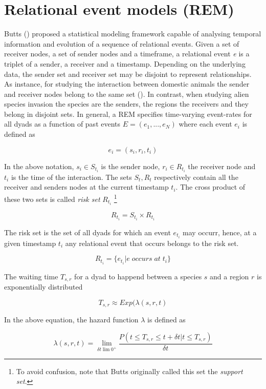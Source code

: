 \documentclass[mscthesis]{usiinfthesis}
\begin{document}
\section{Relational event models (REM)}

Butts (\citet{rem:butts}) proposed a statistical modeling framework capable of analysing temporal information and evolution of a sequence of relational events. Given a set of receiver nodes, a set of sender nodes and a timeframe, a relational event \textit{e} is a triplet of a sender, a receiver and a timestamp. Depending on the underlying data, the sender set and receiver set may be disjoint to represent relationships. As instance, for studying the interaction between domestic animals the sender and receiver nodes belong to the same set (\citep{intro:cattle}). In contrast, when studying alien species invasion the species are the senders, the regions the receivers and they belong in disjoint sets. In general, a REM specifies time-varying event-rates for all dyads as a function of past events $E=(e_1, ..., e_N)$ where each event $e_i$ is defined as

\[
e_i = (s_i, r_i, t_i)
\]

In the above notation, $s_i \in S_{t_i} $ is the sender node, $r_i \in R_{t_i}$ the receiver node and $t_i$ is the time of the interaction. The sets $S_t, R_t$ respectively contain all the receiver and senders nodes at the current timestamp $t_i$. The cross product of these two sets is called \textit{risk set} $R_{t_i}$  \footnote{\label{riskset_footnote}To avoid confusion, note that Butts originally called this set the \textit{support set}.}



\[
R_{t_i} = S_{t_i} \times R_{t_i}
\]

The risk set is the set of all dyads for which an event $e_{t_i}$ may occurr, hence, at a given timestamp $t_i$ any relational event that occurs belongs to the risk set.

\[
R_{t_i} = \{e_{t_i} | e \; occurs \; at \; t_i\}
\]

The waiting time $T_{s,r}$ for a dyad to happend between a species $s$ and a region $r$ is exponentially distributed 

\[
T_{s,r} \approx Exp(\lambda(s, r, t)
\]


In the above equation, the hazard function $\lambda$ is defined as

\[
\lambda(s, r, t) = \lim_{\delta t \lim 0^+} \frac{P(t \leq T_{s,r} \leq t + \delta t | t \leq T_{s,r})}{\delta t}
\]
\end{document}
